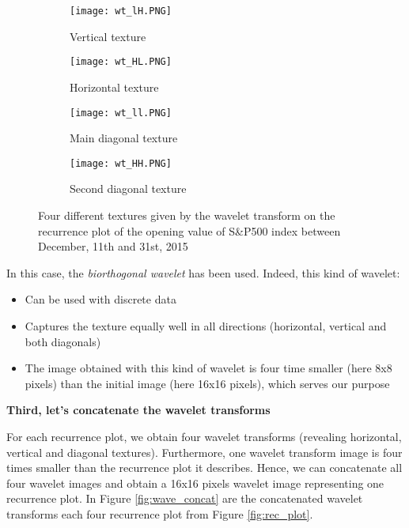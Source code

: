 \documentclass[11pt]{article}
\begin{document}
\begin{onehalfspace}
\begin{figure}[h!]
    \centering
    \captionsetup{justification=centering}
    \begin{subfigure}{0.24\textwidth}
        \texttt{[image: wt\_lH.PNG]}
        \caption{Vertical texture}
    \end{subfigure}
    \begin{subfigure}{0.24\textwidth}
        \texttt{[image: wt\_HL.PNG]}
        \caption{Horizontal texture}
    \end{subfigure}    
    \begin{subfigure}{0.24\textwidth}
        \texttt{[image: wt\_ll.PNG]}
        \caption{Main diagonal texture}
    \end{subfigure}
    \begin{subfigure}{0.24\textwidth}
        \texttt{[image: wt\_HH.PNG]}
        \caption{Second diagonal texture}
    \end{subfigure}
    \caption{Four different textures given by the wavelet transform on the recurrence plot of the opening value of S\&P500 index between December, 11th and 31st, 2015}
    \label{fig:wave_transf}
\end{figure}

In this case, the \textit{biorthogonal wavelet} has been used. Indeed, this kind of wavelet:

\begin{itemize}
    \item Can be used with discrete data
    \item Captures the texture equally well in all directions (horizontal, vertical and both diagonals)
    \item The image obtained with this kind of wavelet is four time smaller (here 8x8 pixels) than the initial image (here 16x16 pixels), which serves our purpose
\end{itemize}

\noindent \textbf{Third, let's concatenate the wavelet transforms }

For each recurrence plot, we obtain four wavelet transforms (revealing horizontal, vertical and diagonal textures). Furthermore, one wavelet transform image is four times smaller than the recurrence plot it describes. Hence, we can concatenate all four wavelet images and obtain a 16x16 pixels wavelet image representing one recurrence plot. In Figure \ref{fig:wave_concat} are the concatenated wavelet transforms each four recurrence plot from Figure \ref{fig:rec_plot}. 


\end{onehalfspace}
\end{document}
